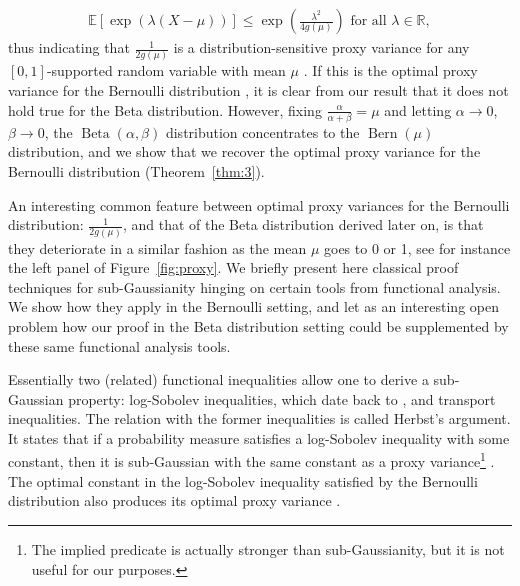 \documentclass[15pt]{article}
\newcommand{\R}{\mathbb{R}}
\newcommand{\E}{\mathbb{E}}
\def\E{\mathbb{E}}
\DeclareMathOperator{\Beta}{Beta}
\DeclareMathOperator{\Bern}{Bern}
\theoremstyle{plain}
\begin{document}
\begin{align}\label{eq:kearns}
\E[\exp(\lambda (X-\mu))]\le\exp\left(\frac{\lambda^2}{4g(\mu)}\right)\,\,\text{for all } \lambda\in\R,
\end{align}
thus indicating that  $\frac{1}{2g(\mu)}$ is a distribution-sensitive proxy variance for any $[0,1]$-supported random variable with mean $\mu$ \citep[see also][for a detailed proof of this result]{berend2013concentration}. If this is the optimal proxy variance for the Bernoulli distribution \citep[see Theorem 2.1 and Theorem 3.1 of][]{buldygin2000binary}, it is clear from our result that it does not hold true for the Beta distribution. %
However, fixing $\frac{\alpha}{\alpha+\beta} = \mu$ and letting $\alpha\to0$, $\beta\to0$, the $\Beta(\alpha,\beta)$ distribution concentrates to the $\Bern(\mu)$ distribution, and we show that we recover the optimal proxy variance for the Bernoulli distribution (Theorem~\ref{thm:3}).

An interesting common feature between optimal proxy variances for the Bernoulli distribution:  $\frac{1}{2g(\mu)}$, and that of the Beta distribution derived later on, is that they deteriorate in  a similar fashion as the mean $\mu$ goes to 0 or 1, see for instance the left panel of Figure~\ref{fig:proxy}. We briefly present here classical proof techniques for sub-Gaussianity hinging on certain tools from functional analysis. We show how they apply in the Bernoulli setting, and let as an interesting open problem how our proof in the Beta distribution setting could be supplemented by these same functional analysis tools. 

Essentially two (related) functional inequalities allow one to derive a sub-Gaussian property: log-Sobolev inequalities, which date back to \cite{gross1975logarithmic}, and transport inequalities. The relation with the former inequalities is called Herbst's argument. It states that if a probability measure satisfies a  log-Sobolev inequality with some constant, then  it is sub-Gaussian with the same constant as a proxy variance\footnote{The implied predicate is actually stronger than sub-Gaussianity, but it is not useful for our purposes.}  \citep[see for instance][Section 2.3 and Proposition 2.3]{ledoux1999concentration}. The optimal constant in the log-Sobolev inequality satisfied by the Bernoulli distribution also produces its optimal proxy variance \citep[][Corollary 5.9]{ledoux1999concentration}.
\end{document}
